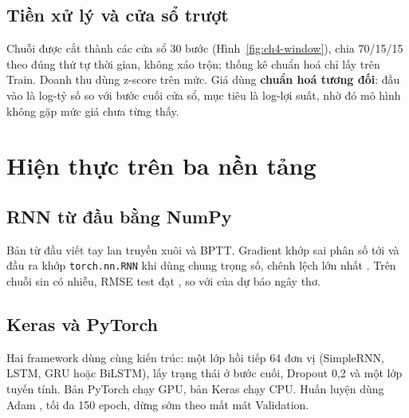 

\subsection{Tiền xử lý và cửa sổ trượt}
Chuỗi được cắt thành các cửa sổ 30 bước (Hình~\ref{fig:ch4-window}), chia 70/15/15 theo đúng thứ tự thời gian, không xáo trộn; thống kê chuẩn hoá chỉ lấy trên Train. Doanh thu dùng z-score trên mức. Giá dùng \textbf{chuẩn hoá tương đối}: đầu vào là log-tỷ số so với bước cuối cửa sổ, mục tiêu là log-lợi suất, nhờ đó
mô hình không gặp mức giá chưa từng thấy.


\section{Hiện thực trên ba nền tảng}\label{sec:rnn-impl}
\subsection{RNN từ đầu bằng NumPy}
Bản từ đầu viết tay lan truyền xuôi và BPTT. Gradient khớp sai phân số tới  và đầu ra khớp \texttt{torch.nn.RNN} khi dùng chung trọng số, chênh lệch lớn nhất . Trên chuỗi sin có nhiễu, RMSE test đạt , so với  của dự báo ngây thơ.



\subsection{Keras và PyTorch}
Hai framework dùng cùng kiến trúc: một lớp hồi tiếp 64 đơn vị (SimpleRNN, LSTM, GRU hoặc BiLSTM), lấy trạng thái ở bước cuối, Dropout 0,2 và một lớp tuyến tính. Bản PyTorch \cite{ch0:paszke2019} chạy GPU, bản Keras \cite{ch4:chollet2021} chạy CPU. Huấn luyện dùng Adam \cite{ch4:kingma2015}, tối đa 150 epoch, dừng sớm theo mất mát Validation.

